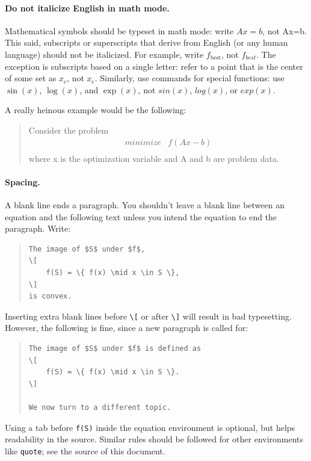 \documentclass[12pt]{article}
\begin{document}
\paragraph{Do not italicize English in math mode.}
Mathematical symbols should be typeset in math mode:
write $Ax=b$, not Ax=b. This said, subscripts or
superscripts that derive from English (or any human language) should not be
italicized. For example, write $f_\mathrm{best}$, not $f_{best}$. The exception
is subscripts based on a single letter: refer
to a point that is the center of some set as $x_c$, not $x_{\mathrm{c}}$.
Similarly, use commands for special functions: use $\sin(x)$,
$\log(x)$, and $\exp(x)$, not $sin(x)$, $log(x)$, or $exp(x)$.

A really heinous example would be the following:
\begin{quote}
Consider the problem
\[
\begin{array}{ll}
minimize & f(Ax - b) \\
\end{array}
\]
where x is the optimization variable and A and b are problem data.
\end{quote}

\paragraph{Spacing.}
A blank line ends a paragraph. You shouldn't leave a blank line between an
equation and the following text unless you intend the equation to end the
paragraph. Write:
\begin{quote}
\begin{verbatim}
The image of $S$ under $f$,
\[
    f(S) = \{ f(x) \mid x \in S \},
\]
is convex.
\end{verbatim}
\end{quote}
Inserting extra blank lines before \verb+\[+ or after \verb+\]+ will result in
bad typesetting. However, the following is fine, since a new paragraph is called for:
\begin{quote}
\begin{verbatim}
The image of $S$ under $f$ is defined as
\[
    f(S) = \{ f(x) \mid x \in S \}.
\]

We now turn to a different topic.
\end{verbatim}
\end{quote}
Using a tab before \verb+f(S)+ inside the equation environment is
optional, but helps readability in the source.  Similar rules should be
followed for other environments like \texttt{quote}; see the source of this
document.
\end{document}
